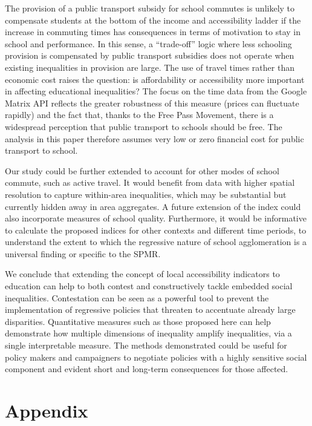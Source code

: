 \documentclass[3p,authoryear,preprint,review,12pt]{elsarticle}
\begin{document}
The provision of a public transport subsidy for school commutes is
unlikely to compensate students at the bottom of the income and
accessibility ladder if the increase in commuting times has consequences in terms of motivation to stay in school and performance. In this sense, a ``trade-off'' logic where less schooling provision is compensated by public transport subsidies does not operate when existing inequalities in provision are large.
The use of travel times rather than economic cost raises the question: is affordability or accessibility more important in affecting educational inequalities?
The focus on the time data from the Google Matrix API reflects the greater robustness of this measure (prices can fluctuate rapidly) and the fact that, thanks to the Free Pass Movement, there is a widespread perception that public transport to schools should be free. The analysis in this paper therefore assumes very low or zero financial cost for public transport to school.


Our study could be further extended to account for other modes of school commute, such as active travel. It would benefit from data with higher spatial resolution to capture within-area inequalities, which may be substantial but currently hidden away in area aggregates. A future extension of the index could also incorporate measures of school quality. Furthermore, it would be informative to calculate the proposed indices for other contexts and different time periods, to understand the extent to which the regressive nature of school agglomeration is a universal finding or specific to the SPMR.

We conclude that extending the concept of local accessibility indicators to education can help to both contest and constructively tackle embedded social inequalities. Contestation can be seen as a powerful tool to prevent the implementation of regressive policies that threaten to accentuate already large disparities. Quantitative measures such as those proposed here can help demonstrate how multiple dimensions of inequality amplify inequalities, via a single interpretable measure. The methods demonstrated could be useful for policy makers and campaigners to negotiate policies with a highly sensitive social component and evident short and long-term consequences for those affected.

\section*{Appendix}
\setcounter{figure}{0}
\renewcommand{\thefigure}{A\arabic{figure}}
\end{document}
